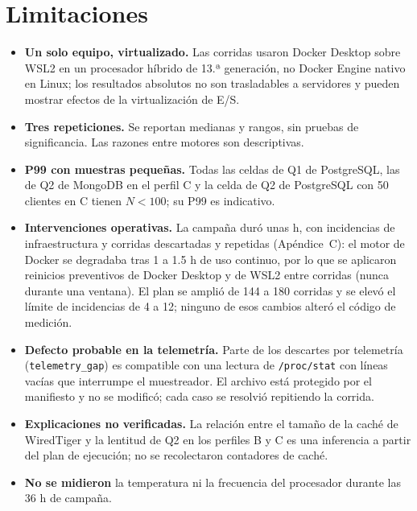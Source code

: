 \documentclass[12pt,letterpaper]{article}
\newcommand{\code}[1]{\texttt{#1}}
\newcommand{\Mongo}{MongoDB}
\newcommand{\PG}{PostgreSQL}
\begin{document}
\section{Limitaciones}
\begin{itemize}
\item \textbf{Un solo equipo, virtualizado.} Las corridas usaron Docker Desktop sobre WSL2 en un procesador híbrido de 13.ª generación, no Docker Engine nativo en Linux; los resultados absolutos no son trasladables a servidores y pueden mostrar efectos de la virtualización de E/S.
\item \textbf{Tres repeticiones.} Se reportan medianas y rangos, sin pruebas de significancia. Las razones entre motores son descriptivas.
\item \textbf{P99 con muestras pequeñas.} Todas las celdas de Q1 de \PG{}, las de Q2 de \Mongo{} en el perfil C y la celda de Q2 de \PG{} con 50 clientes en C tienen $N<100$; su P99 es indicativo.
\item \textbf{Intervenciones operativas.} La campaña duró unas  h, con  incidencias de infraestructura y  corridas descartadas y repetidas (Apéndice~C): el motor de Docker se degradaba tras 1 a 1.5 h de uso continuo, por lo que se aplicaron reinicios preventivos de Docker Desktop y de WSL2 entre corridas (nunca durante una ventana). El plan se amplió de 144 a 180 corridas y se elevó el límite de incidencias de 4 a 12; ninguno de esos cambios alteró el código de medición.
\item \textbf{Defecto probable en la telemetría.} Parte de los descartes por telemetría (\code{telemetry\_gap}) es compatible con una lectura de \code{/proc/stat} con líneas vacías que interrumpe el muestreador. El archivo está protegido por el manifiesto y no se modificó; cada caso se resolvió repitiendo la corrida.
\item \textbf{Explicaciones no verificadas.} La relación entre el tamaño de la caché de WiredTiger y la lentitud de Q2 en los perfiles B y C es una inferencia a partir del plan de ejecución; no se recolectaron contadores de caché.
\item \textbf{No se midieron} la temperatura ni la frecuencia del procesador durante las 36 h de campaña.
\end{itemize}
\end{document}
